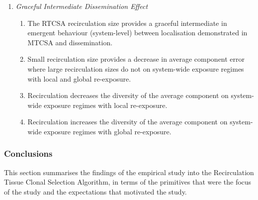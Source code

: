 \begin{enumerate}
	\item \emph{Graceful Intermediate Dissemination Effect}
	\begin{enumerate}
		\item The RTCSA recirculation size provides a graceful intermediate in emergent behaviour (system-level) between localisation demonstrated in MTCSA and dissemination.
		\item Small recirculation size provides a decrease in average component error where large recirculation sizes do not on system-wide exposure regimes with local and global re-exposure.
		\item Recirculation decreases the diversity of the average component on system-wide exposure regimes with local re-exposure.
		\item Recirculation increases the diversity of the average component on system-wide exposure regimes with global re-exposure.
	\end{enumerate}	
\end{enumerate}



%
%
\subsubsection{Conclusions}
This section summarises the findings of the empirical study into the Recirculation Tissue Clonal Selection Algorithm, in terms of the primitives that were the focus of the study and the expectations that motivated the study.

